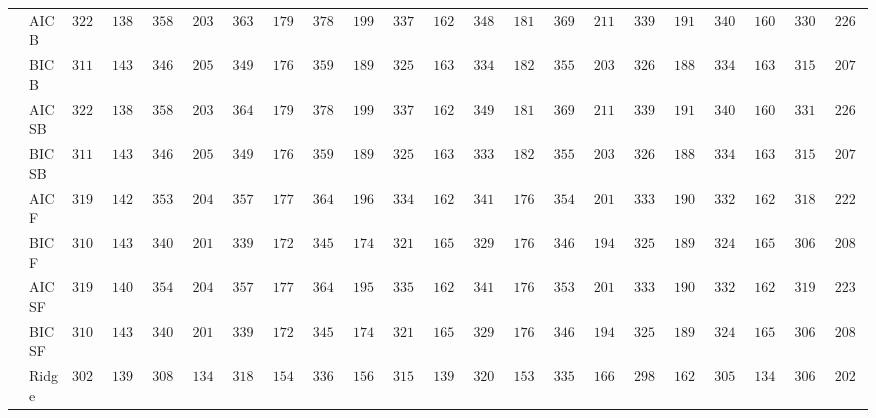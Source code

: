 \begin{tabular}{p{0.2cm}p{1cm}|p{0.6cm}p{0.6cm}|p{0.6cm}p{0.6cm}p{0.6cm}p{0.6cm}p{0.6cm}p{0.6cm}|p{0.6cm}p{0.6cm}p{0.6cm}p{0.6cm}p{0.6cm}p{0.6cm}|p{0.6cm}p{0.6cm}p{0.6cm}p{0.6cm}p{0.6cm}p{0.6cm}}
 & AIC B  & $3220.16$ & $1383.38$ & $3589.31$ & $2034.33$ & $3636.60$ & $1795.53$ & $3781.95$ & $1993.58$ & $3373.34$ & $1624.77$ & $3483.19$ & $1811.93$ & $3694.69$ & $2117.88$ & $3393.78$ & $1918.89$ & $3403.66$ & $1606.88$ & $3306.95$ & $2264.20$ \\
 & BIC B  & $3113.66$ & $1430.16$ & $3460.08$ & $2059.92$ & $3496.18$ & $1767.32$ & $3590.24$ & $1897.56$ & $3252.85$ & $1637.29$ & $3340.98$ & $1826.53$ & $3555.73$ & $2035.95$ & $3262.57$ & $1881.76$ & $3341.54$ & $1638.03$ & $3152.95$ & $2075.80$ \\
 & AIC SB  & $3221.95$ & $1381.55$ & $3589.31$ & $2034.33$ & $3642.23$ & $1796.25$ & $3784.90$ & $1991.18$ & $3375.76$ & $1624.44$ & $3491.90$ & $1814.25$ & $3695.86$ & $2117.27$ & $3391.27$ & $1917.09$ & $3403.66$ & $1606.88$ & $3312.98$ & $2263.58$ \\
 & BIC SB  & $3113.66$ & $1430.16$ & $3460.08$ & $2059.92$ & $3496.18$ & $1767.32$ & $3594.29$ & $1894.40$ & $3250.56$ & $1638.71$ & $3335.71$ & $1822.40$ & $3554.98$ & $2036.75$ & $3264.74$ & $1881.76$ & $3342.98$ & $1639.56$ & $3154.19$ & $2076.11$ \\
 & AIC F  & $3196.10$ & $1423.35$ & $3539.03$ & $2042.14$ & $3578.16$ & $1778.22$ & $3648.79$ & $1960.31$ & $3349.17$ & $1622.79$ & $3416.14$ & $1768.94$ & $3540.33$ & $2012.35$ & $3331.11$ & $1907.99$ & $3324.51$ & $1629.43$ & $3182.74$ & $2228.08$ \\
 & BIC F  & $3108.18$ & $1437.73$ & $3405.44$ & $2013.75$ & $3398.22$ & $1728.91$ & $3456.21$ & $1745.66$ & $3219.23$ & $1657.99$ & $3298.42$ & $1765.76$ & $3466.19$ & $1949.73$ & $3253.74$ & $1890.02$ & $3248.38$ & $1658.12$ & $3069.18$ & $2083.13$ \\
 & AIC SF  & $3190.94$ & $1402.93$ & $3542.59$ & $2042.87$ & $3576.27$ & $1776.80$ & $3646.71$ & $1957.36$ & $3350.61$ & $1622.97$ & $3418.32$ & $1769.22$ & $3535.57$ & $2017.50$ & $3331.03$ & $1908.06$ & $3329.64$ & $1629.89$ & $3191.37$ & $2235.85$ \\
 & BIC SF  & $3105.66$ & $1439.27$ & $3404.96$ & $2014.40$ & $3398.22$ & $1728.91$ & $3455.33$ & $1743.32$ & $3219.23$ & $1657.99$ & $3298.42$ & $1765.76$ & $3464.77$ & $1946.41$ & $3253.74$ & $1890.02$ & $3248.38$ & $1658.12$ & $3069.18$ & $2083.13$ \\
 & Ridge  & $3024.74$ & $1396.41$ & $3081.78$ & $1349.80$ & $3189.77$ & $1547.37$ & $3367.64$ & $1560.59$ & $3150.50$ & $1390.92$ & $3204.82$ & $1537.10$ & $3358.96$ & $1664.95$ & $2984.83$ & $1620.44$ & $3051.09$ & $1342.73$ & $3065.59$ & $2025.65$ \\

\end{tabular}
